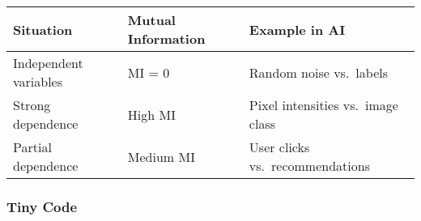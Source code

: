 \documentclass[
  letterpaper,
  DIV=11,
  numbers=noendperiod]{scrreprt}
\begin{document}
\begin{longtable}[]{@{}
  >{\raggedright\arraybackslash}p{}
  >{\raggedright\arraybackslash}p{}
  >{\raggedright\arraybackslash}p{}@{}}
\toprule\noalign{}
\begin{minipage}[b]{\linewidth}\raggedright
Situation
\end{minipage} & \begin{minipage}[b]{\linewidth}\raggedright
Mutual Information
\end{minipage} & \begin{minipage}[b]{\linewidth}\raggedright
Example in AI
\end{minipage} \\
\midrule\noalign{}
\endhead
\bottomrule\noalign{}
\endlastfoot
Independent variables & MI = 0 & Random noise vs.~labels \\
Strong dependence & High MI & Pixel intensities vs.~image class \\
Partial dependence & Medium MI & User clicks vs.~recommendations \\
\end{longtable}

\subsubsection{Tiny Code}\label{tiny-code-24}
\end{document}
